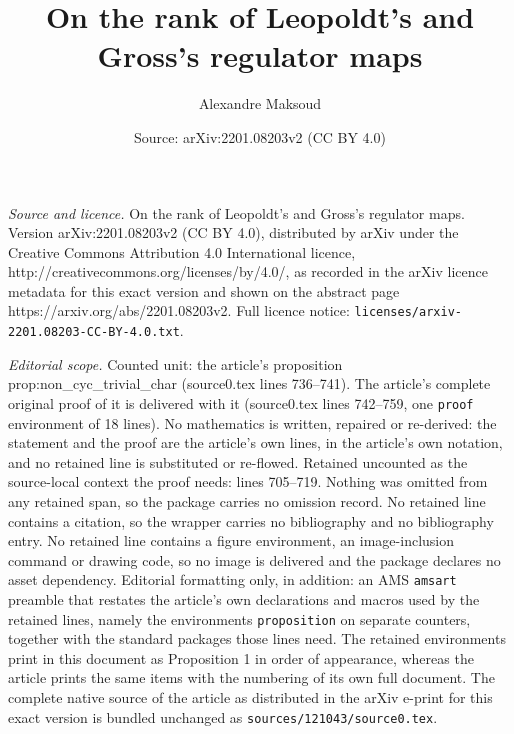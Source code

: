 \documentclass[10pt,a4paper]{amsart}
\title{On the rank of Leopoldt's and Gross's regulator maps}
\author{Alexandre Maksoud}
\date{Source: arXiv:2201.08203v2 (CC BY 4.0)}
\begin{document}
\maketitle

\noindent\emph{Source and licence.} On the rank of Leopoldt's and Gross's regulator maps. Version arXiv:2201.08203v2 (CC BY 4.0), distributed by arXiv under the Creative Commons Attribution 4.0 International licence, http://creativecommons.org/licenses/by/4.0/, as recorded in the arXiv licence metadata for this exact version and shown on the abstract page https://arxiv.org/abs/2201.08203v2. Full licence notice: \texttt{licenses/arxiv-2201.08203-CC-BY-4.0.txt}.\par\smallskip

\noindent\textit{Editorial scope.} Counted unit: the article's proposition prop:non\_cyc\_trivial\_char (source0.tex lines 736--741). The article's complete original proof of it is delivered with it (source0.tex lines 742--759, one \texttt{proof} environment of 18 lines). No mathematics is written, repaired or re-derived: the statement and the proof are the article's own lines, in the article's own notation, and no retained line is substituted or re-flowed.  Retained uncounted as the source-local context the proof needs: lines 705--719.  Nothing was omitted from any retained span, so the package carries no omission record.  No retained line contains a citation, so the wrapper carries no bibliography and no bibliography entry.  No retained line contains a figure environment, an image-inclusion command or drawing code, so no image is delivered and the package declares no asset dependency.  Editorial formatting only, in addition: an AMS \texttt{amsart} preamble that restates the article's own declarations and macros used by the retained lines, namely the environments \texttt{proposition} on separate counters, together with the standard packages those lines need.  The retained environments print in this document as Proposition 1 in order of appearance, whereas the article prints the same items with the numbering of its own full document.  The complete native source of the article as distributed in the arXiv e-print for this exact version is bundled unchanged as \texttt{sources/121043/source0.tex}.
\end{document}
